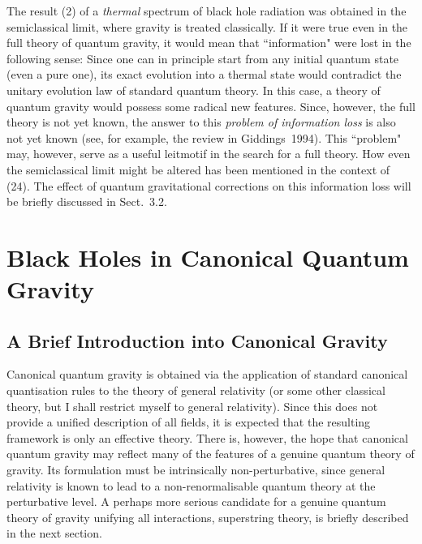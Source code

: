 \documentclass[12pt]{article}
\begin{document}
The result (2) of a {\em thermal} spectrum of black hole
radiation was obtained in the semiclassical limit, where
gravity is treated classically. If it were true even in the full
theory of quantum gravity, it would mean that ``information"
were lost in the following sense: Since one can in principle
start from any initial quantum state (even a pure one),
its exact evolution into a thermal state would contradict
the unitary evolution law of standard quantum theory.
In this case, a theory of quantum gravity would possess some
radical new features. Since, however, the full theory is not
yet known, the answer to this {\em problem of information
loss} is also not yet known (see, for example, the
review in Giddings~1994). This ``problem" may, however, serve as
a useful leitmotif in the search for a full theory. How even the
semiclassical limit might be altered has been mentioned in
the context of (24). The effect of quantum gravitational
corrections on this information loss will be briefly discussed
in Sect.~3.2.

\section{Black Holes in Canonical Quantum Gravity}
\subsection{A Brief Introduction into Canonical Gravity}

Canonical quantum gravity is obtained via the application
of standard canonical quantisation rules to the theory of
general relativity (or some other classical theory, but I shall restrict
myself to general relativity). Since this does not provide a unified 
description of all fields, it is expected that the resulting
framework is only an effective theory. There is, however, the hope
that canonical quantum gravity may reflect many of the features
of a genuine quantum theory of gravity. Its formulation must be
intrinsically non-perturbative, since general relativity is known
to lead to a non-renormalisable quantum theory at the perturbative
level.
A perhaps more serious candidate for a genuine
quantum theory of gravity
unifying all interactions, superstring theory, is
briefly described in the next section.
\end{document}
